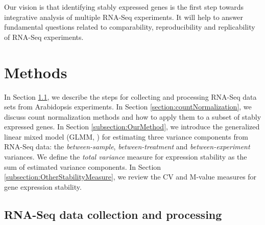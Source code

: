 	Our vision is that identifying stably expressed genes is the first step
	towards integrative analysis of multiple RNA-Seq experiments. It will help to
	answer fundamental questions related to  comparability, reproducibility and
	replicability of RNA-Seq experiments.
	
	\section{Methods} 
	\label{section:Methods}
	In Section \ref{section:DataCollection}, we describe the steps for collecting
	and processing RNA-Seq data sets from Arabidopsis experiments.  In Section
	\ref{section:countNormalization}, we discuss count normalization methods and
	how to apply them to a subset of stably expressed genes.
	In Section \ref{subsection:OurMethod},  we introduce the generalized linear
	mixed model (GLMM, \citealt{mcculloch2001generalized}) for estimating three
	variance components from RNA-Seq data: the \textit{between-sample},
	\textit{between-treatment} and \textit{between-experiment} variances.  We
	define the \textit{total variance} measure for expression stability as the sum
	of estimated variance components.  In Section
	\ref{subsection:OtherStabilityMeasure}, we review the CV and M-value measures
	for gene expression stability.
	
	
	
	\subsection{RNA-Seq data collection and processing}\label{section:DataCollection} 
	
